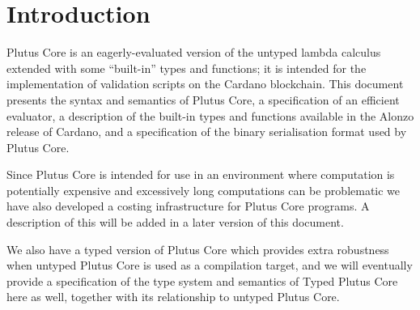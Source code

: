 \section{Introduction}
\label{sec:introduction}
Plutus Core is an eagerly-evaluated version of the untyped lambda calculus
extended with some ``built-in'' types and functions; it is intended for the
implementation of validation scripts on the Cardano blockchain.  This document
presents the syntax and semantics of Plutus Core, a specification of an
efficient evaluator, a description of the built-in types and functions available
in the Alonzo release of Cardano, and a specification of the binary
serialisation format used by Plutus Core.

Since Plutus Core is intended for use in an environment where
computation is potentially expensive and excessively long computations can be
problematic we have also developed a costing infrastructure for Plutus Core
programs. A description of this will be added in a later version of this
document.

We also have a typed version of Plutus Core which provides extra robustness when
untyped Plutus Core is used as a compilation target, and we will eventually
provide a specification of the type system and semantics of Typed Plutus Core
here as well, together with its relationship to untyped Plutus Core.
